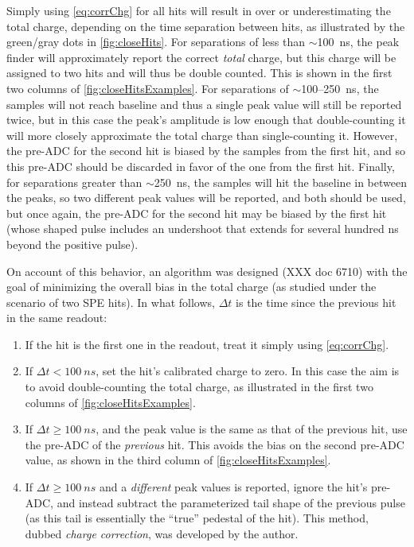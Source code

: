 \documentclass[../thesis.tex]{subfiles}
\begin{document}
Simply using \eqref{eq:corrChg} for all hits will result in over or underestimating the total charge, depending on the time separation between hits, as illustrated by the green/gray dots in \autoref{fig:closeHits}. For separations of less than $\sim$100~ns, the peak finder will approximately report the correct \emph{total} charge, but this charge will be assigned to two hits and will thus be double counted. This is shown in the first two columns of \autoref{fig:closeHitsExamples}. For separations of $\sim$100--250~ns, the samples will not reach baseline and thus a single peak value will still be reported twice, but in this case the peak's amplitude is low enough that double-counting it will more closely approximate the total charge than single-counting it. However, the pre-ADC for the second hit is biased by the samples from the first hit, and so this pre-ADC should be discarded in favor of the one from the first hit. Finally, for separations greater than $\sim$250~ns, the samples will hit the baseline in between the peaks, so two different peak values will be reported, and both should be used, but once again, the pre-ADC for the second hit may be biased by the first hit (whose shaped pulse includes an undershoot that extends for several hundred ns beyond the positive pulse).

On account of this behavior, an algorithm was designed (XXX doc 6710) with the goal of minimizing the overall bias in the total charge (as studied under the scenario of two SPE hits). In what follows, $\Delta t$ is the time since the previous hit in the same readout:

\begin{enumerate}
\item If the hit is the first one in the readout, treat it simply using \eqref{eq:corrChg}.
\item If $\Delta t < \SI{100}{ns}$, set the hit's calibrated charge to zero. In this case the aim is to avoid double-counting the total charge, as illustrated in the first two columns of \autoref{fig:closeHitsExamples}.
\item If $\Delta t \ge \SI{100}{ns}$, and the peak value is the same as that of the previous hit, use the pre-ADC of the \emph{previous} hit. This avoids the bias on the second pre-ADC value, as shown in the third column of \autoref{fig:closeHitsExamples}.
\item If $\Delta t \ge \SI{100}{ns}$ and a \emph{different} peak values is reported, ignore the hit's pre-ADC, and instead subtract the parameterized tail shape of the previous pulse (as this tail is essentially the ``true'' pedestal of the hit). This method, dubbed \emph{charge correction}, was developed by the author.
\end{enumerate}
\end{document}
